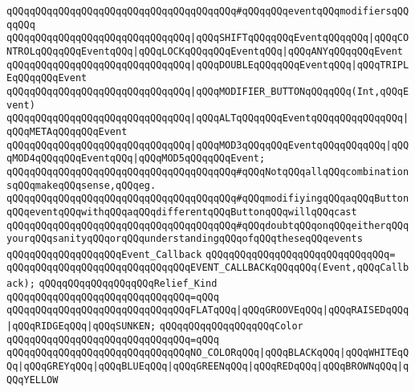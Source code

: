 \verb|qQQqqQQqqQQqqQQqqQQqqQQqqQQqqQQqqQQqqQQq#qQQqqQQqeventqQQqmodifiersqQQqqQQq|\newline
\verb|qQQqqQQqqQQqqQQqqQQqqQQqqQQqqQQq|\verb#|qQQqSHIFTqQQqqQQqEventqQQqqQQq|qQQqCONTROLqQQqqQQqEventqQQq|qQQqLOCKqQQqqQQqEventqQQq|qQQqANYqQQqqQQqEvent#\newline
\verb|qQQqqQQqqQQqqQQqqQQqqQQqqQQqqQQq|\verb#|qQQqDOUBLEqQQqqQQqEventqQQq|qQQqTRIPLEqQQqqQQqEvent#\newline
\verb|qQQqqQQqqQQqqQQqqQQqqQQqqQQqqQQq|\verb#|qQQqMODIFIER_BUTTONqQQqqQQq(Int,qQQqEvent)#\newline
\verb|qQQqqQQqqQQqqQQqqQQqqQQqqQQqqQQq|\verb#|qQQqALTqQQqqQQqEventqQQqqQQqqQQqqQQq|qQQqMETAqQQqqQQqEvent#\newline
\verb|qQQqqQQqqQQqqQQqqQQqqQQqqQQqqQQq|\verb#|qQQqMOD3qQQqqQQqEventqQQqqQQqqQQq|qQQqMOD4qQQqqQQqEventqQQq|qQQqMOD5qQQqqQQqEvent;#\newline
\verb|qQQqqQQqqQQqqQQqqQQqqQQqqQQqqQQqqQQqqQQq#qQQqNotqQQqallqQQqcombinationsqQQqmakeqQQqsense,qQQqeg.|\newline
\verb|qQQqqQQqqQQqqQQqqQQqqQQqqQQqqQQqqQQqqQQq#qQQqmodifiyingqQQqaqQQqButtonqQQqeventqQQqwithqQQqaqQQqdifferentqQQqButtonqQQqwillqQQqcast|\newline
\verb|qQQqqQQqqQQqqQQqqQQqqQQqqQQqqQQqqQQqqQQq#qQQqdoubtqQQqonqQQqeitherqQQqyourqQQqsanityqQQqorqQQqunderstandingqQQqofqQQqtheseqQQqevents|\newline
\newline
\verb|qQQqqQQqqQQqqQQqqQQqEvent_Callback|\newline
\verb|qQQqqQQqqQQqqQQqqQQqqQQqqQQqqQQq=|\newline
\verb|qQQqqQQqqQQqqQQqqQQqqQQqqQQqqQQqEVENT_CALLBACKqQQqqQQq(Event,qQQqCallback);|\newline
\newline
\verb|qQQqqQQqqQQqqQQqqQQqRelief_Kind|\newline
\verb|qQQqqQQqqQQqqQQqqQQqqQQqqQQqqQQq=qQQq|\newline
\verb|qQQqqQQqqQQqqQQqqQQqqQQqqQQqqQQqFLATqQQq|\verb#|qQQqGROOVEqQQq|qQQqRAISEDqQQq|qQQqRIDGEqQQq|qQQqSUNKEN;#\newline
\newline
\verb|qQQqqQQqqQQqqQQqqQQqColor|\newline
\verb|qQQqqQQqqQQqqQQqqQQqqQQqqQQqqQQq=qQQq|\newline
\verb|qQQqqQQqqQQqqQQqqQQqqQQqqQQqqQQqNO_COLORqQQq|\verb#|qQQqBLACKqQQq|qQQqWHITEqQQq|qQQqGREYqQQq|qQQqBLUEqQQq|qQQqGREENqQQq|qQQqREDqQQq|qQQqBROWNqQQq|qQQqYELLOW#\newline
